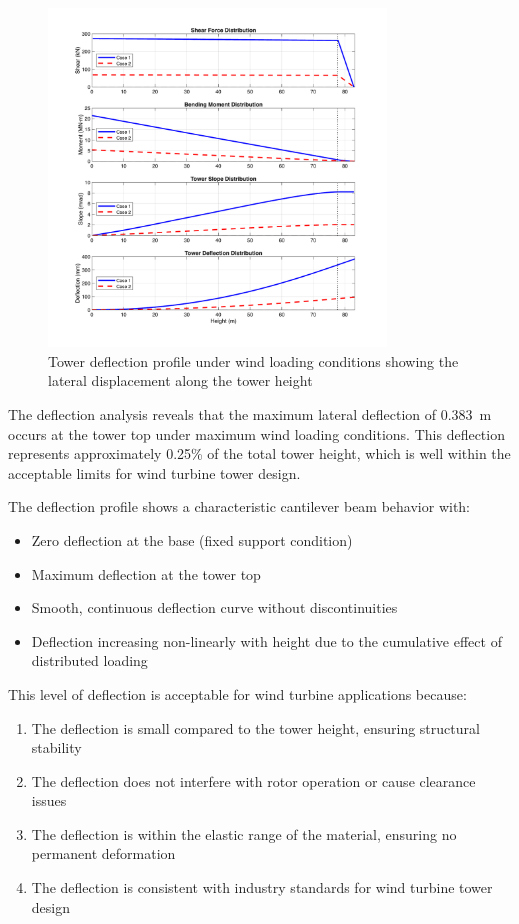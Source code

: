 \documentclass[12pt]{article}
\begin{document}
\begin{figure}[H]
    \centering
    \includegraphics[width=0.8\textwidth]{PNGS/Tower_Deflection_Analysis.png}
    \caption{Tower deflection profile under wind loading conditions showing the lateral displacement along the tower height}
    \label{fig:deflection}
\end{figure}

The deflection analysis reveals that the maximum lateral deflection of \SI{0.383}{\meter} occurs at the tower top under maximum wind loading conditions. This deflection represents approximately 0.25\% of the total tower height, which is well within the acceptable limits for wind turbine tower design.

The deflection profile shows a characteristic cantilever beam behavior with:
\begin{itemize}
    \item Zero deflection at the base (fixed support condition)
    \item Maximum deflection at the tower top
    \item Smooth, continuous deflection curve without discontinuities
    \item Deflection increasing non-linearly with height due to the cumulative effect of distributed loading
\end{itemize}

This level of deflection is acceptable for wind turbine applications because:
\begin{enumerate}
    \item The deflection is small compared to the tower height, ensuring structural stability
    \item The deflection does not interfere with rotor operation or cause clearance issues
    \item The deflection is within the elastic range of the material, ensuring no permanent deformation
    \item The deflection is consistent with industry standards for wind turbine tower design
\end{enumerate}
\end{document}
